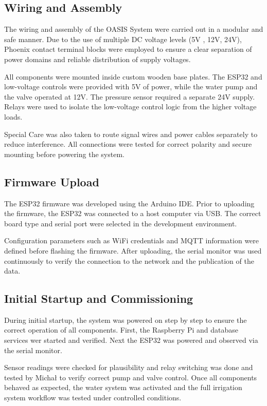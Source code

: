\documentclass[paper=a4,fontsize=12pt,ngerman]{scrartcl}
\begin{document}
\begin{table}[H]
    \caption{Bill of Materials}  
    \label{tab:bom}
\end{table}


\subsection{Wiring and Assembly}
The wiring and assembly of the OASIS System were carried out in a modular and safe manner. Due to the use of multiple DC voltage levels (5V , 12V, 24V), Phoenix contact terminal blocks were employed to ensure a clear separation of power domains and reliable distribution of supply voltages.

All components were mounted inside custom wooden base plates. The ESP32 and low-voltage controls were provided with 5V of power, while the water pump and the valve operated at 12V. The pressure sensor required a separate 24V supply. Relays were used to isolate the low-voltage control logic from the higher voltage loads. 

Special Care was also taken to route signal wires and power cables separately to reduce interference.  All connections were tested for correct polarity and secure mounting before powering the system.


\subsection{Firmware Upload}
The ESP32 firmware was developed using the Arduino IDE. Prior to uploading the firmware, the ESP32 was connected to a host computer via USB. The correct board type and serial port were selected in the development environment. 

Configuration parameters such as WiFi credentials and MQTT information were defined before flashing the firmware. After uploading, the serial monitor was used continuously to verify the connection to the network and the publication of the data.

\subsection{Initial Startup and Commissioning}
During initial startup, the system was powered on step by step to ensure the correct operation of all components. First, the Raspberry Pi and database services wer started and verified. Next the ESP32 was powered and observed via the serial monitor. 

Sensor readings were checked for plausibility and relay switching was done and  tested by Micha{\l} to verify correct pump and valve control. Once all components behaved as expected, the water system was activated and the full irrigation system workflow was tested under controlled conditions.
\end{document}
